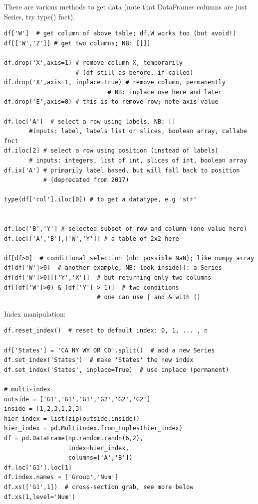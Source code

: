 \documentclass[12pt]{article}
\begin{document}
There are various methods to get data (note that DataFrames columns are just Series, try type() fnct).
\begin{lstlisting}
df['W']  # get column of above table; df.W works too (but avoid!)
df[['W','Z']] # get two columns; NB: [[]]

df.drop('X',axis=1) # remove column X, temporarily 
                    # (df still as before, if called)
df.drop('X',axis=1, inplace=True) # remove column, permanently
                             # NB: inplace use here and later
df.drop('E',axis=0) # this is to remove row; note axis value

df.loc['A']  # select a row using labels. NB: []
	   #inputs: label, labels list or slices, boolean array, callabe fnct
df.iloc[2] # select a row using position (instead of labels)
	   # inputs: integers, list of int, slices of int, boolean array
df.ix['A'] # primarily label based, but will fall back to position
           # (deprecated from 2017)

type(df['col'].iloc[0]) # to get a datatype, e.g 'str'


df.loc['B','Y'] # selected subset of row and column (one value here)
df.loc[['A','B'],['W','Y']] # a table of 2x2 here

df[df>0]  # conditional selection (nb: possible NaN); like numpy array
df[df['W']>0]  # another example, NB: look inside[]: a Series
df[df['W']>0][['Y','X']]  # but returning only two columns
df[(df['W']>0) & (df['Y'] > 1)]  # two conditions 
                          # one can use | and & with ()
\end{lstlisting}

Index manipulation:
\begin{lstlisting}
df.reset_index()  # reset to default index: 0, 1, ... , n

df['States'] = 'CA NY WY OR CO'.split()  # add a new Series
df.set_index('States')  # make 'States' the new index
df.set_index('States', inplace=True)  # use inplace (permanent)

# multi-index
outside = ['G1','G1','G1','G2','G2','G2']
inside = [1,2,3,1,2,3]
hier_index = list(zip(outside,inside))
hier_index = pd.MultiIndex.from_tuples(hier_index)
df = pd.DataFrame(np.random.randn(6,2),
                  index=hier_index,
                  columns=['A','B'])
df.loc['G1'].loc[1]
df.index.names = ['Group','Num']
df.xs(['G1',1])  # cross-section grab, see more below
df.xs(1,level='Num')
\end{lstlisting}
\end{document}
